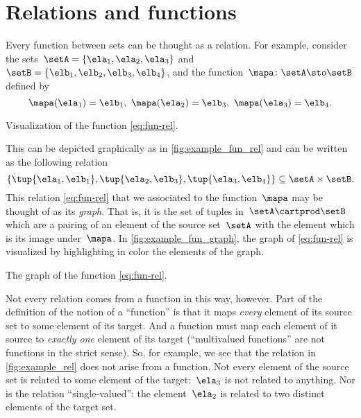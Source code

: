 

\section{Relations and functions}


Every function between sets can be thought as a relation.
For example, consider the sets~$\setA = \{ \ela_1, \ela_2, \ela_3 \}$ and~$\setB = \{ \elb_1, \elb_2, \elb_3, \elb_4 \}$, and the function~$\mapa \colon \setA \sto \setB$ defined by
\begin{equation}
    \mapa (\ela_1) = \elb_1, \ \mapa (\ela_2) = \elb_3, \ \mapa(\ela_3) = \elb_4.
\end{equation}
\begin{marginfigure}
    \centering
    \caption{Visualization of the function \cref{eq:fun-rel}.}
    \label{fig:example_fun_rel}
\end{marginfigure}
This can be depicted graphically as in \cref{fig:example_fun_rel} and can be written as the following relation
\begin{equation}
    \label{eq:fun-rel}
    \{ \tup{\ela_1, \elb_1}, \tup{\ela_2, \elb_3}, \tup{\ela_3, \elb_4} \} \subseteq \setA \times \setB.
\end{equation}
This relation \cref{eq:fun-rel} that we associated to the function~$\mapa$ may be thought of as its \emph{graph}.
That is, it is the set of tuples in~$\setA \cartprod \setB$ which are a pairing of an element of the source set~$\setA$ with the element which is its image under~$\mapa$.
In \cref{fig:example_fun_graph}, the graph of \cref{eq:fun-rel} is visualized by highlighting in color the elements of the graph.
\begin{marginfigure}
    \centering
    \caption{The graph of the function \cref{eq:fun-rel}.}
    \label{fig:example_fun_graph}
\end{marginfigure}

Not every relation comes from a function in this way, however. Part of the definition of the notion of a ``function'' is that it maps \emph{every} element of its source set to some element of its target.
And a function must map each element of it source to \emph{exactly one} element of its target (``multivalued functions'' are not functions in the strict sense).
So, for example, we see that the relation in \cref{fig:example_rel} does not arise from a function.
Not every element of the source set is related to some element of the target:~$\ela_3$ is not related to anything.
Nor is the relation ``single-valued'': the element~$\ela_2$ is related to two distinct elements of the target set.

